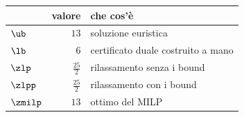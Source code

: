 \begin{center}\small
\begin{tabular}{lrl}
\toprule
 & valore & che cos'è \\
\midrule
$\ub$ & $13$ & soluzione euristica \\
$\lb$ & $6$ & certificato duale costruito a mano \\
$\zlp$ & $\frac{25}{2}$ & rilassamento senza i bound \\
$\zlpp$ & $\frac{25}{2}$ & rilassamento con i bound \\
$\zmilp$ & $13$ & ottimo del MILP \\
\bottomrule
\end{tabular}
\end{center}
